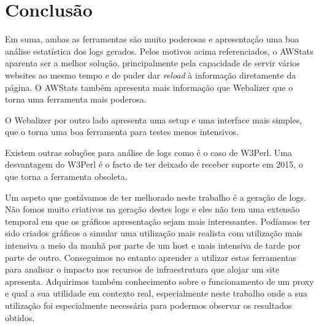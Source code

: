 \chapter{Conclusão}
Em suma, ambas as ferramentas são muito poderosas e apresentação uma boa análise estatística dos logs gerados. 
Pelos motivos acima referenciados, o AWStats aparenta ser a melhor solução, principalmente pela capacidade de servir vários websites ao
mesmo tempo e de puder dar \textit{reload} à informação diretamente da página.
O AWStats também apresenta mais informação que Webalizer que o torna uma ferramenta mais poderosa.

O Webalizer por outro lado apresenta uma setup e uma interface mais simples, que o torna uma boa ferramenta para testes menos intensivos.

Existem outras soluções para análise de logs como é o caso de W3Perl. Uma desvantagem do W3Perl é o facto de ter deixado de receber suporte em 2015, o que torna a ferramenta obsoleta.

Um aspeto que gostávamos de ter melhorado neste trabalho é a geração de logs.
Não fomos muito criativos na geração destes logs e eles não tem uma extensão temporal em que os gráficos apresentação sejam mais interessantes.
Podíamos ter sido criados gráficos a simular uma utilização mais realista com utilização mais intensiva a meio da manhã por parte de um host e mais intensiva de tarde por parte de outro.
Conseguimos no entanto aprender a utilizar estas ferramentas para analisar o impacto nos recursos de infraestrutura que alojar um site apresenta.
Adquirimos também conhecimento sobre o funcionamento de um proxy e qual a sua utilidade em contexto real, especialmente neste trabalho onde a sua utilização foi especialmente necessária para podermos observar os resultados obtidos.
